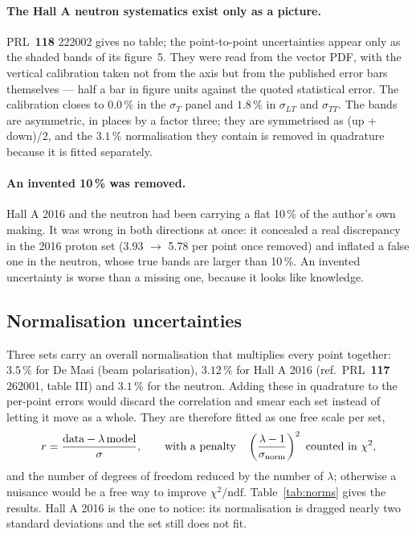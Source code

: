 \documentclass[11pt,a4paper]{article}
\newcommand{\sig}[1]{\sigma_{#1}}
\begin{document}
\paragraph{The Hall A neutron systematics exist only as a picture.}
PRL~\textbf{118} 222002 gives no table; the point-to-point uncertainties appear
only as the shaded bands of its figure~5.  They were read from the vector PDF,
with the vertical calibration taken not from the axis but from the published
error bars themselves --- half a bar in figure units against the quoted
statistical error.  The calibration closes to $0.0\,\%$ in the $\sig{T}$ panel
and $1.8\,\%$ in $\sig{LT}$ and $\sig{TT}$.  The bands are asymmetric, in
places by a factor three; they are symmetrised as (up + down)/2, and the
$3.1\,\%$ normalisation they contain is removed in quadrature because it is
fitted separately.

\paragraph{An invented 10\,\% was removed.}  Hall A 2016 and the neutron had
been carrying a flat 10\,\% of the author's own making.  It was wrong in both
directions at once: it concealed a real discrepancy in the 2016 proton set
(3.93 $\to$ 5.78 per point once removed) and inflated a false one in the
neutron, whose true bands are larger than 10\,\%.  An invented uncertainty is
worse than a missing one, because it looks like knowledge.

\subsection{Normalisation uncertainties}

Three sets carry an overall normalisation that multiplies every point together:
$3.5\,\%$ for De Masi (beam polarisation), $3.12\,\%$ for Hall A 2016
(ref.~PRL~\textbf{117} 262001, table III) and $3.1\,\%$ for the neutron.  Adding
these in quadrature to the per-point errors would discard the correlation and
smear each set instead of letting it move as a whole.  They are therefore
fitted as one free scale per set,
\begin{equation}
r = \frac{\text{data} - \lambda\,\text{model}}{\sigma},
\qquad\text{with a penalty}\quad \left(\frac{\lambda-1}{\sigma_{\rm norm}}\right)^2
\ \text{counted in }\chi^2,
\end{equation}
and the number of degrees of freedom reduced by the number of $\lambda$;
otherwise a nuisance would be a free way to improve $\chi^2/\mathrm{ndf}$.
Table~\ref{tab:norms} gives the results.  Hall A 2016 is the one to notice: its
normalisation is dragged nearly two standard deviations and the set still does
not fit.
\end{document}
